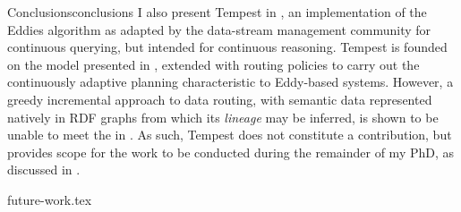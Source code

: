 \begin{nestedsection}{Conclusions}{conclusions}
	I also present Tempest in , an implementation of the Eddies algorithm as adapted by the data-stream management community for continuous querying, but intended for continuous reasoning.
	Tempest is founded on the model presented in , extended with routing policies to carry out the continuously adaptive planning characteristic to Eddy-based systems.
	However, a greedy incremental approach to data routing, with semantic data represented natively in RDF graphs from which its \emph{lineage} \citep{CACQ} may be inferred, is shown to be unable to meet the  in .
	As such, Tempest does not constitute a contribution, but provides scope for the work to be conducted during the remainder of my PhD, as discussed in .

	{future-work.tex}
\end{nestedsection}